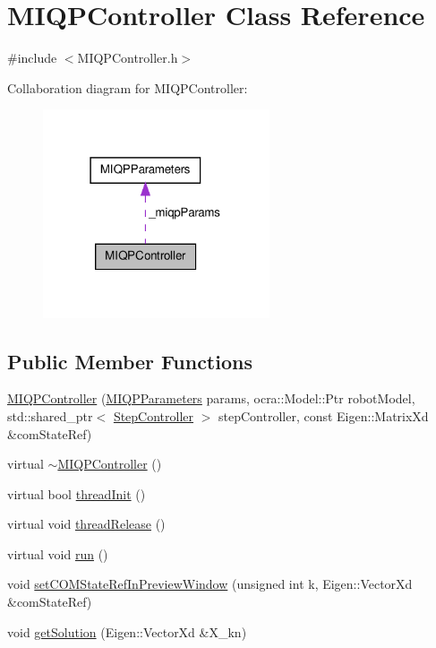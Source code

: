 \hypertarget{classMIQPController}{\section{\-M\-I\-Q\-P\-Controller \-Class \-Reference}
\label{classMIQPController}
}


{\ttfamily \#include $<$\-M\-I\-Q\-P\-Controller.\-h$>$}



\-Collaboration diagram for \-M\-I\-Q\-P\-Controller\-:\nopagebreak
\begin{figure}[H]
\begin{center}
\leavevmode
\includegraphics[width=190pt]{classMIQPController__coll__graph}
\end{center}
\end{figure}
\subsection*{\-Public \-Member \-Functions}
\begin{DoxyCompactItemize}
\item 
\hyperlink{classMIQPController_a5fec189a29105d999d3bb2721977945a}{\-M\-I\-Q\-P\-Controller} (\hyperlink{structMIQPParameters}{\-M\-I\-Q\-P\-Parameters} params, ocra\-::\-Model\-::\-Ptr robot\-Model, std\-::shared\-\_\-ptr$<$ \hyperlink{classStepController}{\-Step\-Controller} $>$ step\-Controller, const \-Eigen\-::\-Matrix\-Xd \&com\-State\-Ref)
\item 
virtual \hyperlink{classMIQPController_a46e1cc8dba1633a49d934aa20730e358}{$\sim$\-M\-I\-Q\-P\-Controller} ()
\item 
virtual bool \hyperlink{classMIQPController_a7e82a26dc823c7f69d00997d0ca98052}{thread\-Init} ()
\item 
virtual void \hyperlink{classMIQPController_a43faa045ed47859b04f39e99805888c1}{thread\-Release} ()
\item 
virtual void \hyperlink{classMIQPController_aa8fd8452a14d8e7731bf45044e1c7a59}{run} ()
\item 
void \hyperlink{classMIQPController_a69b193f0aab0fa0d0ec439b4d1b2a65f}{set\-C\-O\-M\-State\-Ref\-In\-Preview\-Window} (unsigned int k, \-Eigen\-::\-Vector\-Xd \&com\-State\-Ref)
\item 
void \hyperlink{classMIQPController_a96e30b0c6f47973ec1dd3cf745083f71}{get\-Solution} (\-Eigen\-::\-Vector\-Xd \&\-X\-\_\-kn)
\end{DoxyCompactItemize}
